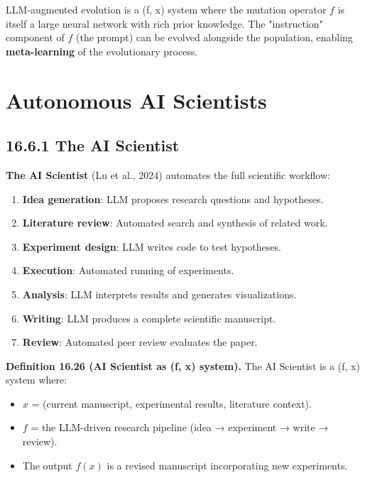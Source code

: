 \begin{proposition}
LLM-augmented evolution is a (f, x) system where the mutation operator $f$ is itself a large neural network with rich prior knowledge. The "instruction" component of $f$ (the prompt) can be evolved alongside the population, enabling \textbf{meta-learning} of the evolutionary process.
\end{proposition}



\section{Autonomous AI Scientists}

\subsection{16.6.1 The AI Scientist}

\textbf{The AI Scientist} (Lu et al., 2024) automates the full scientific workflow:

\begin{enumerate}
\item \textbf{Idea generation}: LLM proposes research questions and hypotheses.
\item \textbf{Literature review}: Automated search and synthesis of related work.
\item \textbf{Experiment design}: LLM writes code to test hypotheses.
\item \textbf{Execution}: Automated running of experiments.
\item \textbf{Analysis}: LLM interprets results and generates visualizations.
\item \textbf{Writing}: LLM produces a complete scientific manuscript.
\item \textbf{Review}: Automated peer review evaluates the paper.
\end{enumerate}

\textbf{Definition 16.26 (AI Scientist as (f, x) system).} The AI Scientist is a (f, x) system where:
\begin{itemize}
\item $x$ = (current manuscript, experimental results, literature context).
\item $f$ = the LLM-driven research pipeline (idea → experiment → write → review).
\item The output $f(x)$ is a revised manuscript incorporating new experiments.
\end{itemize}

